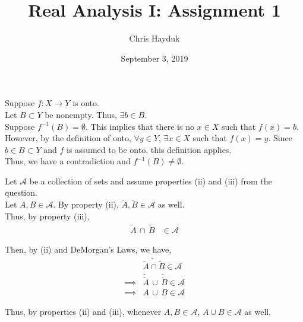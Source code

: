 \documentclass[12pt]{article}
\newenvironment{problem}[2][Problem]{\begin{trivlist}
\item[\hskip \labelsep {\bfseries #1}\hskip \labelsep {\bfseries #2.}]}{\end{trivlist}}
\begin{document}
\title{Real Analysis I: Assignment 1}

\author{Chris Hayduk}
\date{September 3, 2019}

\maketitle

\begin{problem}{1}
\end{problem}

Suppose $f: X \to Y$ is onto.\\

Let $B \subset Y$ be nonempty. Thus, $\exists b \in B$.\\

Suppose $f^{-1}(B) = \emptyset$. This implies that there is no $x \in X$ such that $f(x) = b$.\\

However, by the definition of onto, $\forall y \in Y$, $\exists x \in X$ such that $f(x) = y$. Since $b \in B \subset Y$ and $f$ is assumed to be onto, this definition applies.\\

Thus, we have a contradiction and $f^{-1}(B) \neq \emptyset$.

\begin{problem}{2}
\end{problem}

Let $\mathscr{A}$ be a collection of sets and assume properties (ii) and (iii) from the question.\\

Let $A, B \in \mathscr{A}$. By property (ii), $\tilde{A}, \tilde{B} \in \mathscr{A}$ as well.\\

Thus, by property (iii),
\begin{align*}
\tilde{A} \, \cap \, \tilde{B} &\in \mathscr{A}
\end{align*}

Then, by (ii) and DeMorgan's Laws, we have,
\begin{align*}
&\widetilde{\tilde{A} \cap \tilde{B}} \in \mathscr{A}\\
\implies &\tilde{\tilde{A}} \, \cup \, \tilde{\tilde{B}} \in \mathscr{A}\\
\implies &A \, \cup \, B \in \mathscr{A}
\end{align*}

Thus, by properties (ii) and (iii), whenever $A, B \in \mathscr{A}$, $A \cup B \in \mathscr{A}$ as well.
\end{document}

